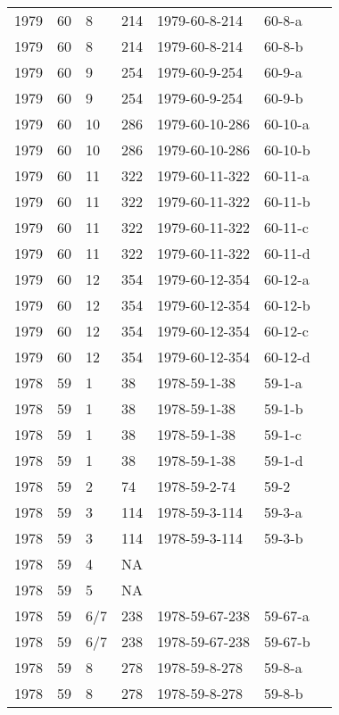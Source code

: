 \begin{longtable}{ |l|l|l|l|p{2.7cm}|l|p{2cm}| }
 1979 & 60 &     8 &     214 & 1979-60-8-214  & 60-8-a & \\
 1979 & 60 &     8 &     214 & 1979-60-8-214  & 60-8-b & \\
 1979 & 60 &     9 &     254 & 1979-60-9-254  & 60-9-a & \\
 1979 & 60 &     9 &     254 & 1979-60-9-254  & 60-9-b & \\
 1979 & 60 &    10 &     286 & 1979-60-10-286 & 60-10-a & \\
 1979 & 60 &    10 &     286 & 1979-60-10-286 & 60-10-b & \\
 1979 & 60 &    11 &     322 & 1979-60-11-322 & 60-11-a & \\
 1979 & 60 &    11 &     322 & 1979-60-11-322 & 60-11-b & \\
 1979 & 60 &    11 &     322 & 1979-60-11-322 & 60-11-c & \\
 1979 & 60 &    11 &     322 & 1979-60-11-322 & 60-11-d & \\
 1979 & 60 &    12 &     354 & 1979-60-12-354 & 60-12-a & \\
 1979 & 60 &    12 &     354 & 1979-60-12-354 & 60-12-b & \\
 1979 & 60 &    12 &     354 & 1979-60-12-354 & 60-12-c & \\
 1979 & 60 &    12 &     354 & 1979-60-12-354 & 60-12-d & \\
 1978 & 59 &     1 &      38 & 1978-59-1-38   & 59-1-a & \\
 1978 & 59 &     1 &      38 & 1978-59-1-38   & 59-1-b & \\
 1978 & 59 &     1 &      38 & 1978-59-1-38   & 59-1-c & \\
 1978 & 59 &     1 &      38 & 1978-59-1-38   & 59-1-d & \\
 1978 & 59 &     2 &      74 & 1978-59-2-74   & 59-2 & \\
 1978 & 59 &     3 &     114 & 1978-59-3-114  & 59-3-a & \\
 1978 & 59 &     3 &     114 & 1978-59-3-114  & 59-3-b & \\
 1978 & 59 &     4 &      NA &                &  & \\
 1978 & 59 &     5 &      NA &                &  & \\
 1978 & 59 &   6/7 &     238 & 1978-59-67-238 & 59-67-a & \\
 1978 & 59 &   6/7 &     238 & 1978-59-67-238 & 59-67-b & \\
 1978 & 59 &     8 &     278 & 1978-59-8-278  & 59-8-a & \\
 1978 & 59 &     8 &     278 & 1978-59-8-278  & 59-8-b & \\

\end{longtable}
